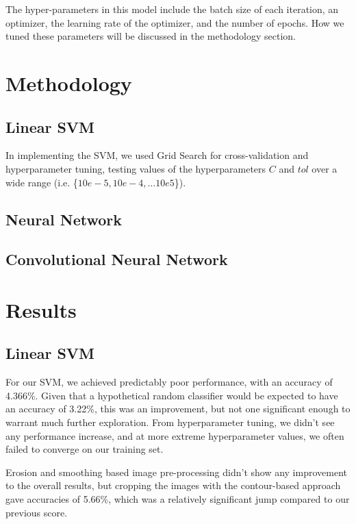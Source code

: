 \documentclass[conference]{IEEEtran}
\begin{document}
The hyper-parameters in this model include the batch size of each iteration, an optimizer, the learning rate of the optimizer, and the number of epochs. How we tuned these parameters will be discussed in the methodology section.

\section{Methodology}

\subsection{Linear SVM}

In implementing the SVM, we used Grid Search for cross-validation and hyperparameter tuning, testing values of the hyperparameters $C$ and $tol$ over a wide range (i.e. \{$10e-5, 10e-4, \ldots 10e5$\}).

\subsection{Neural Network}


\subsection{Convolutional Neural Network}


\section{Results}

\subsection{Linear SVM}

For our SVM, we achieved predictably poor performance, with an accuracy of 4.366\%. Given that a hypothetical random classifier would be expected to have an accuracy of 3.22\%, this was an improvement, but not one significant enough to warrant much further exploration. From hyperparameter tuning, we didn't see any performance increase, and at more extreme hyperparameter values, we often failed to converge on our training set.

Erosion and smoothing based image pre-processing didn't show any improvement to the overall results, but cropping the images with the contour-based approach gave accuracies of 5.66\%, which was a relatively significant jump compared to our previous score.
\end{document}
